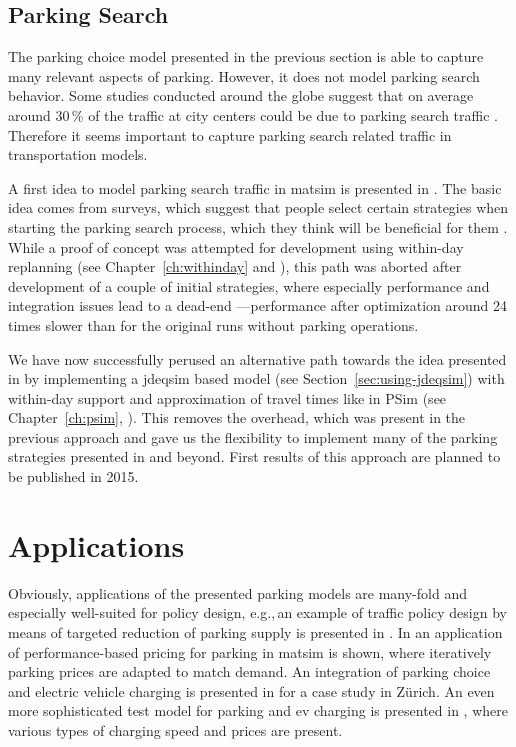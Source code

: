 \subsection{Parking Search}
The parking choice model presented in the previous section is able to capture many relevant aspects of parking. However, it does not model parking search behavior. Some studies conducted around the globe suggest that on average around 30\,\% of the traffic at city centers could be due to parking search traffic \citet[][]{Shoup_RSUE_2004}. Therefore it seems important to capture parking search related traffic in transportation models.

A first idea to model parking search traffic in \gls{matsim} is presented in \citet[][]{Waraich_unpub_IATBR_2012}. The basic idea comes from surveys, which suggest that people select certain strategies when starting the parking search process, which they think will be beneficial for them \citet[][]{AxhausenPolak_1989}. While a proof of concept was attempted for development using within-day replanning (see Chapter~\ref{ch:withinday} and \citep[][]{DoblerEtAl_TRR_2012}), this path was aborted after development of a couple of initial strategies, where especially performance and integration issues lead to a dead-end \citet[][]{WaraichEtAl_unpub_TRB_2013}---performance after optimization around 24\,times slower than for the original runs without parking operations. 

We have now successfully perused an alternative path towards the idea presented in \citet[][]{Waraich_unpub_IATBR_2012} by implementing a \gls{jdeqsim} based model (see Section~\ref{sec:using-jdeqsim}) with within-day support and approximation of travel times like in PSim (see Chapter~\ref{ch:psim}, \citet[][]{FourieEtAl_TRR_2013}). This removes the overhead, which was present in the previous approach and gave us the flexibility to implement many of the parking strategies presented in \citet[][]{AxhausenPolak_1989} and beyond. First results of this approach are planned to be published in 2015.

\section{Applications}
Obviously, applications of the presented parking models are many-fold and especially well-suited for policy design, e.g.,\,an example of traffic policy design by means of targeted reduction of parking supply is presented in \citet[][]{WaraichAxhausen_TRR_2012}. In \citet[][]{WaraichEtAl_unpub_TRB_2013} an application of performance-based pricing for parking in \gls{matsim} is shown, where iteratively parking prices are adapted to match demand. An integration of parking choice and electric vehicle charging is presented in \citet[][]{WaraichEtAl_JanssensEtAl_2014} for a case study in Zürich. An even more sophisticated test model for parking and \gls{ev} charging is presented in \citet[][]{BemetzHohenfellner_BSCThesis_2014}, where various types of charging speed and prices are present.

